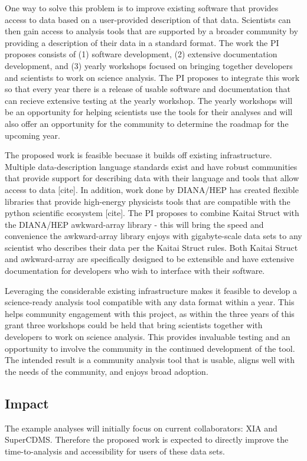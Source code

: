 One way to solve this problem is to improve existing software that provides access to data based on a user-provided description of that data.  Scientists can then gain access to analysis tools that are supported by a broader community by providing a description of their data in a standard format.  The work the PI proposes consists of (1) software development, (2) extensive documentation development, and (3) yearly workshops focused on bringing together developers and scientists to work on science analysis.  The PI proposes to integrate this work so that every year there is a release of usable software and documentation that can recieve extensive testing at the yearly workshop.  The yearly workshops will be an opportunity for helping scientists use the tools for their analyses and will also offer an opportunity for the community to determine the roadmap for the upcoming year.

The proposed work is feasible becuase it builds off existing infrastructure.  Multiple data-description language standards exist and have robust communities that provide support for describing data with their language and tools that allow access to data [cite].  In addition, work done by DIANA/HEP has created flexible libraries that provide high-energy physicists tools that are compatible with the python scientific ecosystem [cite].  The PI proposes to combine Kaitai Struct with the DIANA/HEP awkward-array library - this will bring the speed and convenience the awkward-array library enjoys with gigabyte-scale data sets to any scientist who describes their data per the Kaitai Struct rules.  Both Kaitai Struct and awkward-array are specifically designed to be extensible and have extensive documentation for developers who wish to interface with their software.  

Leveraging the considerable existing infrastructure makes it feasible to develop a science-ready analysis tool compatible with any data format within a year.  This helps community engagement with this project, as within the three years of this grant three workshops could be held that bring scientists together with developers to work on science analysis.  This provides invaluable testing and an opportunity to involve the community in the continued development of the tool.  The intended result is a community analysis tool that is usable, aligns well with the needs of the community, and enjoys broad adoption.

\subsection{Impact}
The example analyses will initially focus on current collaborators: XIA and SuperCDMS.  Therefore the proposed work is expected to directly improve the time-to-analysis and accessibility for users of these data sets.

